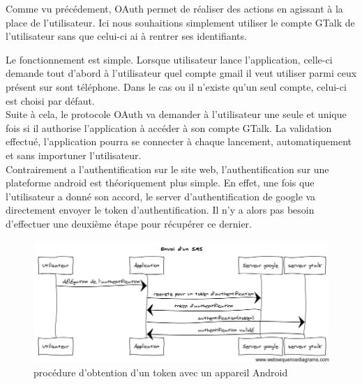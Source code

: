 Comme vu précédement, OAuth permet de réaliser des actions en agissant à la place de l'utilisateur. 
Ici nous souhaitions simplement utiliser le compte GTalk de l'utilisateur sans que celui-ci ai à rentrer
ses identifiants. 

Le fonctionnement est simple. Lorsque utilisateur lance l'application, celle-ci demande tout d'abord
à l'utilisateur quel compte gmail il veut utiliser parmi ceux présent sur sont téléphone. Dans le cas
ou il n'existe qu'un seul compte, celui-ci est choisi par défaut.
\\


Suite à cela, le protocole OAuth va demander à l'utilisateur une seule et unique fois si il authorise 
l'application à accéder à son compte GTalk. La validation effectué, l'application pourra se connecter 
à chaque lancement, automatiquement et sans importuner l'utilisateur. 
\\


Contrairement a l'authentification sur le site web, l'authentification sur une plateforme android est
théoriquement plus simple. En effet, une fois que l'utilisateur a donné son accord, le server 
d'authentification de google va directement envoyer le token d'authentification. Il n'y a alors pas 
besoin d'effectuer une deuxième étape pour récupérer ce dernier.



\begin{figure}[!h]
	\center
	\includegraphics[width=15cm]{img/obtention-token-avec-android.png}
	\caption{procédure d'obtention d'un token avec un appareil Android}
\end{figure}

